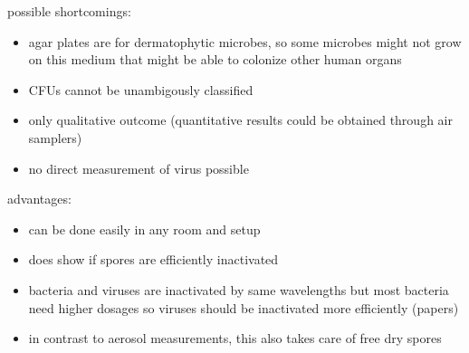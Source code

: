 \documentclass[hyperref]{labbook}
\begin{document}
\newpage
possible shortcomings:
\begin{itemize}
\item agar plates are for dermatophytic microbes, so some microbes might not grow on this medium that might be able to colonize other human organs
\item CFUs cannot be unambigously classified
\item only qualitative outcome (quantitative results could be obtained through air samplers)
\item no direct measurement of virus possible
\end{itemize}
advantages:
\begin{itemize}
\item can be done easily in any room and setup
\item does show if spores are efficiently inactivated
\item bacteria and viruses are inactivated by same wavelengths but most bacteria need higher dosages so viruses should be inactivated more efficiently (papers)
\item in contrast to aerosol measurements, this also takes care of free dry spores
\end{itemize}
\end{document}
